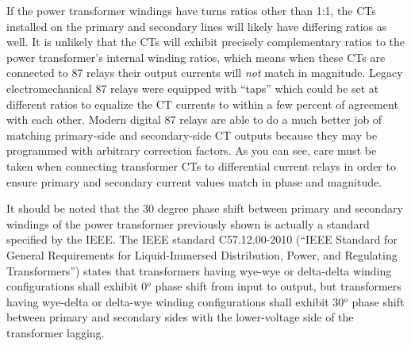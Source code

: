 If the power transformer windings have turns ratios other than 1:1, the CTs installed on the primary and secondary lines will likely have differing ratios as well.  It is unlikely that the CTs will exhibit precisely complementary ratios to the power transformer's internal winding ratios, which means when these CTs are connected to 87 relays their output currents will \textit{not} match in magnitude.  Legacy electromechanical 87 relays were equipped with ``taps'' which could be set at different ratios to equalize the CT currents to within a few percent of agreement with each other.  Modern digital 87 relays are able to do a much better job of matching primary-side and secondary-side CT outputs because they may be programmed with arbitrary correction factors.  As you can see, care must be taken when connecting transformer CTs to differential current relays in order to ensure primary and secondary current values match in phase and magnitude.

\vskip 10pt

It should be noted that the 30 degree phase shift between primary and secondary windings of the power transformer previously shown is actually a standard specified by the IEEE.  The IEEE standard C57.12.00-2010 (``IEEE Standard for General Requirements for Liquid-Immersed Distribution, Power, and Regulating Transformers'') states that transformers having wye-wye or delta-delta winding configurations shall exhibit 0$^{o}$ phase shift from input to output, but transformers having wye-delta or delta-wye winding configurations shall exhibit 30$^{o}$ phase shift between primary and secondary sides with the lower-voltage side of the transformer lagging.  

\vskip 10pt


